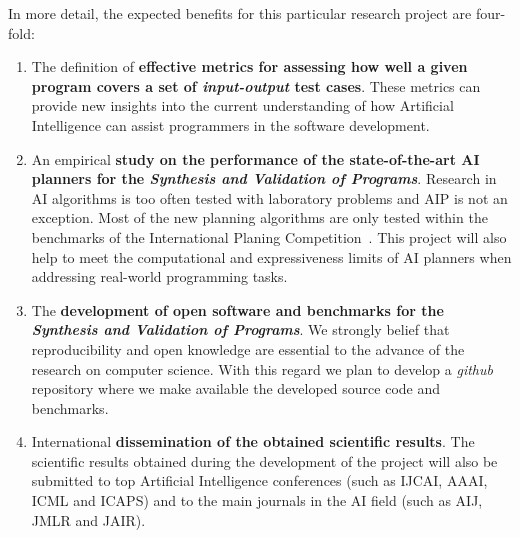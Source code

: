 \documentclass[10pt,a4paper]{paper}
\begin{document}
In more detail, the expected benefits for this particular research project are four-fold:
\begin{enumerate}
\item The definition of {\bf effective metrics for assessing how well a given program covers a set of {\em input-output} test cases}. These metrics can provide new insights into the current understanding of how Artificial Intelligence can assist programmers in the software development. 
\item An empirical {\bf study on the performance of the state-of-the-art AI planners for the {\em Synthesis and Validation of Programs}}. Research in AI algorithms is too often tested with laboratory problems and AIP is not an exception. Most of the new planning algorithms are only tested within the benchmarks of the International Planing Competition~\cite{vallati:IPC:AI15}. This project will also help to meet the computational and expressiveness limits of AI planners when addressing real-world programming tasks. 
\item The {\bf development of open software and benchmarks for the {\em Synthesis and Validation of Programs}}. We strongly belief that reproducibility and open knowledge are essential to the advance of the research on computer science. With this regard we plan to develop a {\em github} repository where we make available the developed source code and benchmarks.
\item International {\bf dissemination of the obtained scientific results}. The scientific results obtained during the development of the project will also be submitted to top Artificial Intelligence conferences (such as IJCAI, AAAI, ICML and ICAPS) and to the main journals in the AI field (such as AIJ, JMLR and JAIR).
\end{enumerate}

\vspace{0.3cm}

\begin{tiny}

\end{tiny}

\end{document}
